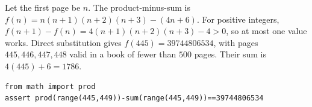 Let the first page be $ n $. The product-minus-sum is $ f(n)=n(n+1)(n+2)(n+3)-(4n+6)$. For positive integers, $ f(n+1)-f(n)=4(n+1)(n+2)(n+3)-4>0 $, so at most one value works. Direct substitution gives $ f(445)=39744806534 $, with pages $ 445,446,447,448 $ valid in a book of fewer than $ 500 $ pages. Their sum is $ 4(445)+6=\boxed{1786}$.
\begin{verbatim}
from math import prod
assert prod(range(445,449))-sum(range(445,449))==39744806534
\end{verbatim}

